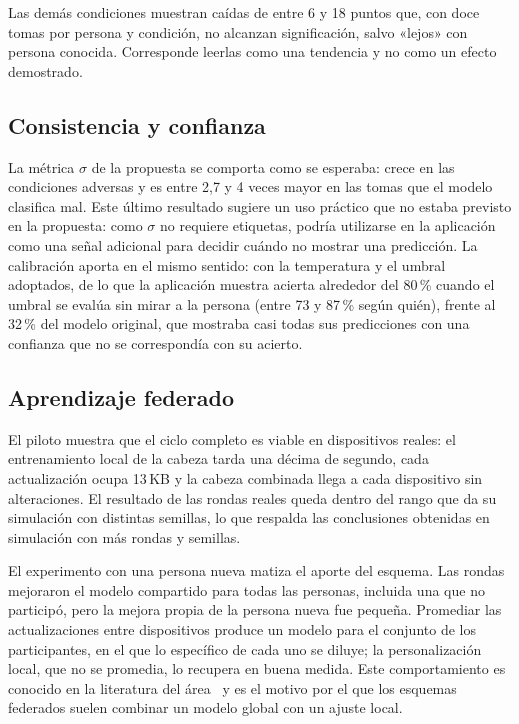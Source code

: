 Las demás condiciones muestran caídas de entre 6 y 18 puntos que, con doce tomas por persona y condición, no alcanzan significación, salvo «lejos» con persona conocida. Corresponde leerlas como una tendencia y no como un efecto demostrado.

\subsection{Consistencia y confianza}

La métrica $\sigma$ de la propuesta se comporta como se esperaba: crece en las condiciones adversas y es entre 2,7 y 4 veces mayor en las tomas que el modelo clasifica mal. Este último resultado sugiere un uso práctico que no estaba previsto en la propuesta: como $\sigma$ no requiere etiquetas, podría utilizarse en la aplicación como una señal adicional para decidir cuándo no mostrar una predicción. La calibración aporta en el mismo sentido: con la temperatura y el umbral adoptados, de lo que la aplicación muestra acierta alrededor del 80\,\% cuando el umbral se evalúa sin mirar a la persona (entre 73 y 87\,\% según quién), frente al 32\,\% del modelo original, que mostraba casi todas sus predicciones con una confianza que no se correspondía con su acierto.

\subsection{Aprendizaje federado}

El piloto muestra que el ciclo completo es viable en dispositivos reales: el entrenamiento local de la cabeza tarda una décima de segundo, cada actualización ocupa 13\,KB y la cabeza combinada llega a cada dispositivo sin alteraciones. El resultado de las rondas reales queda dentro del rango que da su simulación con distintas semillas, lo que respalda las conclusiones obtenidas en simulación con más rondas y semillas.

El experimento con una persona nueva matiza el aporte del esquema. Las rondas mejoraron el modelo compartido para todas las personas, incluida una que no participó, pero la mejora propia de la persona nueva fue pequeña. Promediar las actualizaciones entre dispositivos produce un modelo para el conjunto de los participantes, en el que lo específico de cada uno se diluye; la personalización local, que no se promedia, lo recupera en buena medida. Este comportamiento es conocido en la literatura del área~\cite{kairouz2021advances} y es el motivo por el que los esquemas federados suelen combinar un modelo global con un ajuste local.

